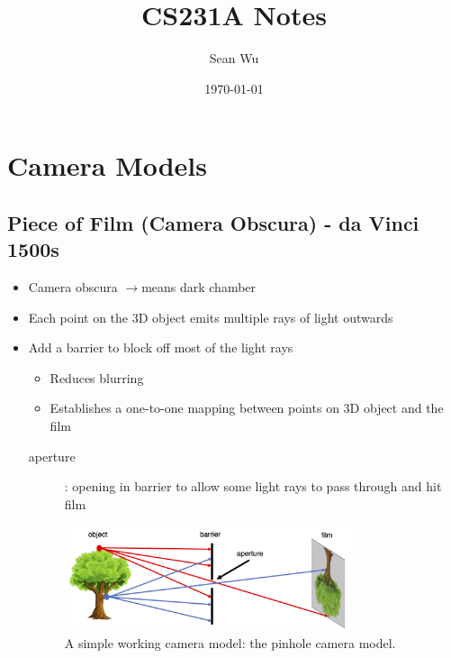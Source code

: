 \documentclass[letterpaper,12pt]{article}
\newcommand{\lra}{\ensuremath{\longrightarrow{}}}
\begin{document}
\title{CS231A Notes}
\author{Sean Wu}
\date{\today}
\maketitle

\tableofcontents

\pagebreak

\setlength{\parindent}{0em}
\setlength{\parskip}{1em}

\section{Camera Models}
\subsection{Piece of Film (Camera Obscura) - da Vinci 1500s}
\begin{itemize}
 \item Camera obscura \lra means dark chamber
 \item Each point on the 3D object emits multiple rays of light outwards
 \item Add a barrier to block off most of the light rays
       \begin{itemize}
        \item Reduces blurring
        \item Establishes a one-to-one mapping between points on 3D object and the film
       \end{itemize}
       \begin{description}
        \item[aperture]: opening in barrier to allow some light rays to pass through and hit film
       \end{description}
       \begin{figure}[h!]
        \centering
        \includegraphics[width=0.8\textwidth]{images/camera_obscura.png}
        \caption{A simple working camera model: the pinhole camera model.}
       \end{figure}
\end{itemize}
\end{document}
